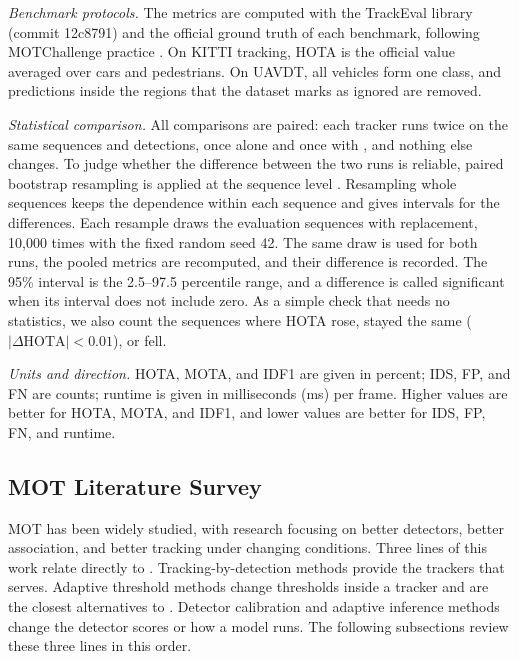\emph{Benchmark protocols.} The metrics are computed with the TrackEval library (commit 12c8791)
and the official ground truth of each benchmark, following MOTChallenge practice
\cite{dendorfer2021motchallenge}. On KITTI tracking, HOTA is the official value averaged over cars
and pedestrians. On UAVDT, all vehicles form one class, and predictions inside the regions that the
dataset marks as ignored are removed.

\emph{Statistical comparison.} All comparisons are paired: each tracker runs twice on the same
sequences and detections, once alone and once with \scl{}, and nothing else changes. To judge
whether the difference between the two runs is reliable, paired bootstrap resampling is applied at
the sequence level \cite{efron1993bootstrap}. Resampling whole sequences keeps the dependence within
each sequence and gives intervals for the differences. Each resample draws the evaluation sequences
with replacement, 10,000 times with the fixed random seed 42. The same draw is used for both runs,
the pooled metrics are recomputed, and their difference is recorded. The 95\% interval is the
2.5--97.5 percentile range, and a difference is called significant when its interval does not
include zero. As a simple check that needs no statistics, we also count the sequences where HOTA
rose, stayed the same ($|\Delta\mathrm{HOTA}|<0.01$), or fell.

\emph{Units and direction.} HOTA, MOTA, and IDF1 are given in percent; IDS, FP, and FN are counts;
runtime is given in milliseconds (ms) per frame. Higher values are better for HOTA, MOTA, and IDF1,
and lower values are better for IDS, FP, FN, and runtime.

\subsection{MOT Literature Survey}\label{sec:survey}
MOT has been widely studied, with research focusing on better detectors, better association, and
better tracking under changing conditions. Three lines of this work relate directly to \scl{}.
Tracking-by-detection methods provide the trackers that \scl{} serves. Adaptive threshold methods
change thresholds inside a tracker and are the closest alternatives to \scl{}. Detector calibration
and adaptive inference methods change the detector scores or how a model runs. The following
subsections review these three lines in this order.

